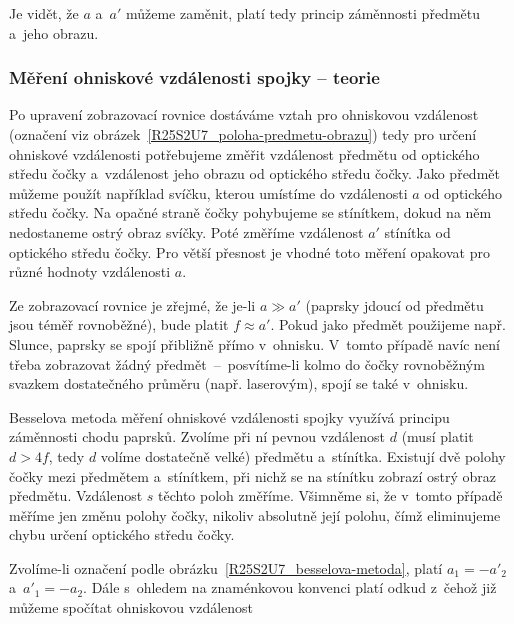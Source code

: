 {Je vidět, že $ a $ a~$ a' $ můžeme zaměnit, platí tedy princip záměnnosti
předmětu a~jeho obrazu.

\subsubsection{Měření ohniskové vzdálenosti spojky -- teorie}



Po upravení zobrazovací rovnice dostáváme vztah pro ohniskovou vzdálenost (označení viz obrázek~\ref{R25S2U7_poloha-predmetu-obrazu})
tedy pro určení ohniskové vzdálenosti potřebujeme změřit vzdálenost
předmětu od optického středu čočky a~vzdálenost jeho obrazu od optického středu
čočky. Jako předmět můžeme použít například svíčku, kterou umístíme do
vzdálenosti $ a $ od optického středu čočky. Na opačné straně čočky pohybujeme
se stínítkem, dokud na něm nedostaneme ostrý obraz svíčky. Poté změříme
vzdálenost $ a' $ stínítka od optického středu čočky. Pro větší přesnost je
vhodné toto měření opakovat pro různé hodnoty vzdálenosti $ a $.


Ze zobrazovací rovnice je zřejmé, že je-li $ a \gg a' $ (paprsky jdoucí od
předmětu jsou téměř rovnoběžné), bude platit $ f \approx a' $. Pokud jako
předmět použijeme např. Slunce, paprsky se spojí přibližně přímo v~ohnisku.
V~tomto případě navíc není třeba zobrazovat žádný předmět~–~posvítíme-li kolmo
do čočky rovnoběžným svazkem dostatečného průměru (např. laserovým), spojí se
také v~ohnisku.


Besselova metoda měření ohniskové vzdálenosti spojky využívá principu záměnnosti
chodu paprsků. Zvolíme při ní pevnou vzdálenost $ d $ (musí platit $ d > 4 f $,
tedy $ d $ volíme dostatečně velké) předmětu a~stínítka. Existují dvě polohy
čočky mezi předmětem a~stínítkem, při nichž se na stínítku zobrazí ostrý obraz
předmětu. Vzdálenost $ s $ těchto poloh změříme. Všimněme si, že v~tomto případě
měříme jen změnu polohy čočky, nikoliv absolutně její polohu, čímž eliminujeme
chybu určení optického středu čočky.

Zvolíme-li označení podle obrázku~\ref{R25S2U7_besselova-metoda}, platí $ a_1 =
- a'_2 $ a~$ a'_1 = - a_2 $. Dále s~ohledem na znaménkovou konvenci platí
odkud
z~čehož již můžeme spočítat ohniskovou vzdálenost

}
